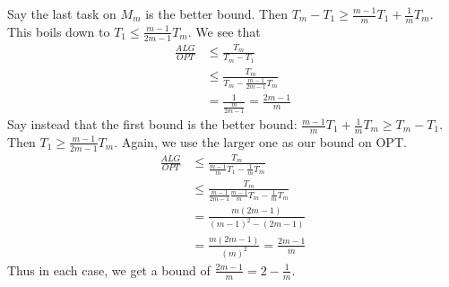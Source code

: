 \documentclass{article}
\newcounter{counter}
\newcommand{\Exercise}{Exercise \stepcounter{counter}\thecounter}
\begin{document}
\vspace{3mm}
Say the last task on $M_m$ is the better bound. Then $T_m - T_1 \geq \frac{m-1}{m}T_1 + \frac{1}{m}T_m$. This boils down to $T_1 \leq \frac{m-1}{2m-1}T_m$. We see that
  $$\begin{aligned}
    \frac{ALG}{OPT} &\leq \frac{T_m}{T_m - T_1} \\
    &\leq \frac{T_m}{T_m - \frac{m-1}{2m-1}T_m} \\
    &= \frac{1}{\frac{m}{2m-1}} = \frac{2m-1}{m}
  \end{aligned}$$
Say instead that the first bound is the better bound: $\frac{m-1}{m}T_1 + \frac{1}{m}T_m \geq T_m - T_1$. Then $T_1 \geq \frac{m-1}{2m-1}T_m$. Again, we use the larger one as our bound on OPT.
 $$ \begin{aligned}
    \frac{ALG}{OPT} &\leq \frac{T_m}{\frac{m-1}{m}T_1 - \frac{1}{m}T_m}\\
    &\leq \frac{T_m}{\frac{m-1}{2m-1}\frac{m-1}{m}T_m - \frac{1}{m}T_m}\\
    &= \frac{m(2m-1)}{(m-1)^2 - (2m-1)}\\
    &= \frac{m(2m-1)}{(m)^2} = \frac{2m-1}{m}
  \end{aligned}$$
  Thus in each case, we get a bound of $\frac{2m-1}{m} = 2 - \frac{1}{m}$.








\end{document}
